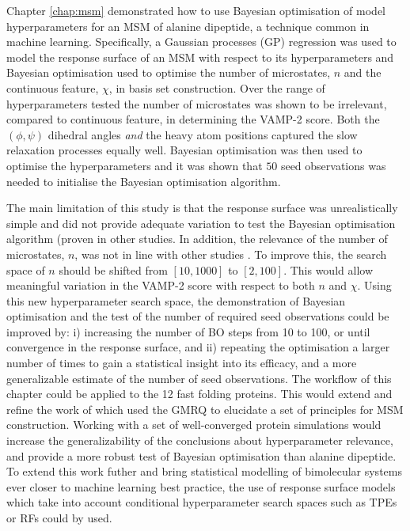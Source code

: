 Chapter \ref{chap:msm} demonstrated how to use Bayesian optimisation of model hyperparameters for an MSM of alanine dipeptide, a technique common in machine learning. Specifically, a Gaussian processes (GP) regression was used to model the response surface of an MSM with respect to its hyperparameters and Bayesian optimisation used to optimise the number of microstates, $n$ and the continuous feature, $\chi$, in basis set construction. Over the range of hyperparameters tested the number of microstates was shown to be irrelevant, compared to continuous feature, in determining the VAMP-2 score. Both the $(\phi, \psi)$ dihedral angles \emph{and} the heavy atom positions captured the slow relaxation processes equally well. Bayesian optimisation was then used to optimise the hyperparameters and it was shown that $50$ seed observations was needed to initialise the Bayesian optimisation algorithm. 

The main limitation of this study is that the response surface was unrealistically simple and did not provide adequate variation to test the Bayesian optimisation algorithm (proven in other studies\cite{bergstraAlgorithmsHyperParameterOptimizationa,bergstrajamesbergstraRandomSearchHyperParameter2012}.  In addition, the relevance of the number of microstates, $n$, was not in line with other studies \cite{mcgibbonStatisticalModelSelection2014a,wuVariationalApproachLearning2020c,mcgibbonVariationalCrossvalidationSlow2015}. To improve this,  the search space of $n$ should be shifted from $[10, 1000]$ to $[2, 100]$. This would allow meaningful variation in the VAMP-2 score with respect to both $n$ and $\chi$.  Using this new hyperparameter search space, the demonstration of Bayesian optimisation and the test of the number of required seed observations could be improved by: i) increasing the number of BO steps from \num{10} to \num{100}, or until convergence in the response surface, and ii) repeating the optimisation a larger number of times to gain a statistical insight into its efficacy, and a more generalizable estimate of the number of seed observations. The workflow of this chapter could be applied to the 12 fast folding proteins\cite{lindorff-larsenHowFastFoldingProteins2011a}. This would extend and refine the work of \cite{husicOptimizedParameterSelection2016} which used the GMRQ to elucidate a set of principles for MSM construction. Working with a set of well-converged protein simulations would increase the generalizability of the conclusions about hyperparameter relevance, and provide a more robust test of Bayesian optimisation than alanine dipeptide.  To extend this work futher and bring statistical modelling of bimolecular systems ever closer to machine learning best practice, the use of response surface models which take into account conditional hyperparameter search spaces such as TPEs or RFs could by used.

